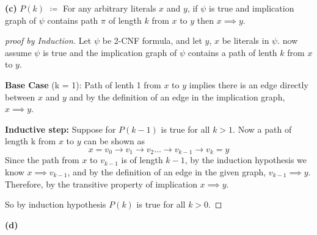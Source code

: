 \documentclass{article}
\begin{document}
\vspace{\baselineskip}
\noindent\textbf{(c)}
$P(k)$ $\coloneq$ For any arbitrary literals $x$ and $y$, if $\psi$ is true and implication graph of $\psi$ contains path $\pi$ of length $k$ from
$x$ to $y$ then $x \implies y$.
\begin{proof}[proof by Induction]
Let $\psi$ be 2-CNF formula, and let $y$, $x$ be literals in $\psi$. now assume $\psi$ is true and the implication graph of $\psi$ contains a path of lenth $k$ from $x$ to $y$.

\textbf{Base Case} (k = 1): Path of lenth 1 from $x$ to $y$ implies there is an edge directly between $x$ and $y$ and by the
definition of an edge in the implication graph, $x \implies y$.

\textbf{Inductive step:} Suppose for $P(k-1)$ is true for all $k > 1$. Now a path of length k from $x$ to $y$ can be shown as
\[x = v_0 \rightarrow v_1 \rightarrow v_2 \dots \rightarrow v_{k-1} \rightarrow v_k = y \]
Since the path from $x$ to $v_{k-1}$ is of length $k-1$, by the induction hypothesis we know $x \implies v_{k-1}$, and by the definition of an edge in the given graph,
$v_{k-1} \implies y$. Therefore, by the transitive property of implication $x \implies y$.

So by induction hypothesis $P(k)$ is true for all $k > 0$.

\end{proof}

\vspace{\baselineskip}
\noindent\textbf{(d)}
\end{document}
